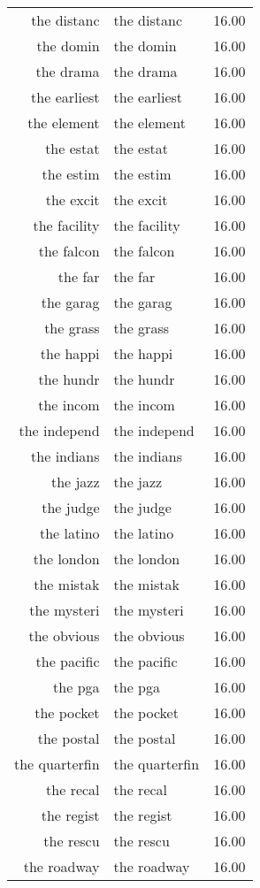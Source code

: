 \begin{table}[ht]
\begin{tabular}{rlr}
  the distanc & the distanc & 16.00 \\ 
  the domin & the domin & 16.00 \\ 
  the drama & the drama & 16.00 \\ 
  the earliest & the earliest & 16.00 \\ 
  the element & the element & 16.00 \\ 
  the estat & the estat & 16.00 \\ 
  the estim & the estim & 16.00 \\ 
  the excit & the excit & 16.00 \\ 
  the facility & the facility & 16.00 \\ 
  the falcon & the falcon & 16.00 \\ 
  the far & the far & 16.00 \\ 
  the garag & the garag & 16.00 \\ 
  the grass & the grass & 16.00 \\ 
  the happi & the happi & 16.00 \\ 
  the hundr & the hundr & 16.00 \\ 
  the incom & the incom & 16.00 \\ 
  the independ & the independ & 16.00 \\ 
  the indians & the indians & 16.00 \\ 
  the jazz & the jazz & 16.00 \\ 
  the judge & the judge & 16.00 \\ 
  the latino & the latino & 16.00 \\ 
  the london & the london & 16.00 \\ 
  the mistak & the mistak & 16.00 \\ 
  the mysteri & the mysteri & 16.00 \\ 
  the obvious & the obvious & 16.00 \\ 
  the pacific & the pacific & 16.00 \\ 
  the pga & the pga & 16.00 \\ 
  the pocket & the pocket & 16.00 \\ 
  the postal & the postal & 16.00 \\ 
  the quarterfin & the quarterfin & 16.00 \\ 
  the recal & the recal & 16.00 \\ 
  the regist & the regist & 16.00 \\ 
  the rescu & the rescu & 16.00 \\ 
  the roadway & the roadway & 16.00 \\ 

\end{tabular}
\end{table}

